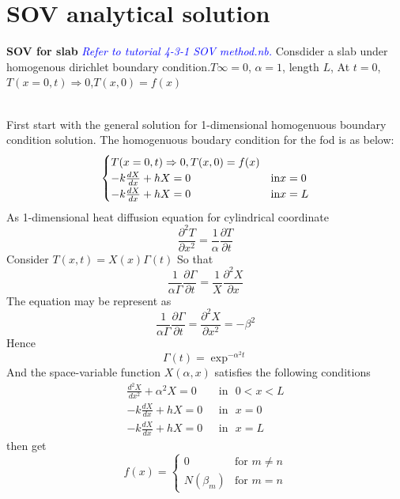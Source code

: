 \section{SOV analytical solution}
\begin{example}
\textbf{SOV for slab}
\textcolor{blue} {\emph{Refer to tutorial 4-3-1 SOV method.nb.}}
Consdider a slab under homogenous dirichlet boundary condition.$T\infty=0$, $\alpha=1$, length $L$, 
At $t=0$, $T(x=0,t)\Rightarrow0$,$T(x,0)=f(x)$
\end{example}
\begin{solution}
~\\
First start with the general solution for 1-dimensional homogenuous boundary condition solution. The homogenuous boudary condition for the fod is as below:
\begin{equation}
\begin{cases}
T(x=0,t)\Rightarrow0, T(x,0)=f(x)\\
-k\frac{dX}{dx}+hX=0 &$in$ x=0\\
-k\frac{dX}{dx}+hX=0 &$in$ x=L
\end{cases}
\end{equation}
As 1-dimensional heat diffusion equation for cylindrical coordinate
$$\frac{\partial^2 T}{\partial x^2}=\frac{1}{\alpha}\frac{\partial T}{\partial t}$$
Consider $T(x,t)=X(x)\Gamma(t)$
So that
$$\frac{1}{\alpha\Gamma}\frac{\partial\Gamma}{\partial t}=\frac{1}{X}\frac{\partial^2 X}{\partial x}$$
The equation may be represent as
$$\frac{1}{\alpha\Gamma}\frac{\partial\Gamma}{\partial t}
=\frac{\partial^2 X}{\partial x^2}=-\beta^2$$
Hence 
$$\Gamma(t)=\exp^{-\alpha^2 t}$$
And the space-variable function $X(\alpha,x)$ satisfies the following conditions\\
\begin{align}
\frac{d^2 X}{d x^2}+\alpha^2X=0 &\text{~~in~~} 0<x<L\\
-k\frac{dX}{dx}+hX=0 &\text{~~in~~} x=0\\
-k\frac{dX}{dx}+hX=0 &\text{~~in~~} x=L
\end{align}
then get
\[
 f(x) =
  \begin{cases}
   0 & \text{for } m \neq n \\
   N(\beta_m)      & \text{for } m=n
  \end{cases}
\]
  

\end{solution}
